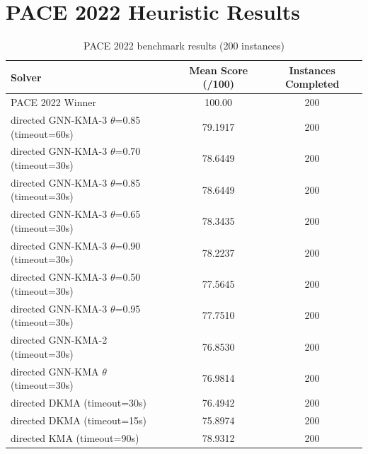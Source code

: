 \documentclass[10pt,a4paper]{report}
\theoremstyle{definition}
\begin{document}
\section{PACE 2022 Heuristic Results}

\begin{table}[H]
	\centering
	\caption{PACE 2022 benchmark results (200 instances)}
	\label{tab:pace_results}
	\begin{tabular}{lcc}
		\toprule
		\textbf{Solver}                                & \textbf{Mean Score (/100)} & \textbf{Instances Completed} \\
		\midrule
		PACE 2022 Winner                               & 100.00                     & 200                        \\
		\midrule
		directed GNN-KMA-3 $\theta$=0.85 (timeout=60s)      & 79.1917                    & 200                        \\
		directed GNN-KMA-3 $\theta$=0.70 (timeout=30s)      & 78.6449                    & 200                        \\
		directed GNN-KMA-3 $\theta$=0.85 (timeout=30s)      & 78.6449                    & 200                        \\
		directed GNN-KMA-3 $\theta$=0.65 (timeout=30s)      & 78.3435                    & 200                        \\
		directed GNN-KMA-3 $\theta$=0.90 (timeout=30s)      & 78.2237                    & 200                        \\
		directed GNN-KMA-3 $\theta$=0.50 (timeout=30s)      & 77.5645                    & 200                        \\
		directed GNN-KMA-3 $\theta$=0.95 (timeout=30s)      & 77.7510                    & 200                        \\
		directed GNN-KMA-2 (timeout=30s)                    & 76.8530                    & 200                        \\
		directed GNN-KMA $\theta$ (timeout=30s)             & 76.9814                    & 200                        \\
		directed DKMA (timeout=30s)                         & 76.4942                    & 200                        \\
		directed DKMA (timeout=15s)                         & 75.8974                    & 200                        \\
		directed KMA (timeout=90s)                          & 78.9312                    & 200                        \\

\end{tabular}
\end{table}
\end{document}
